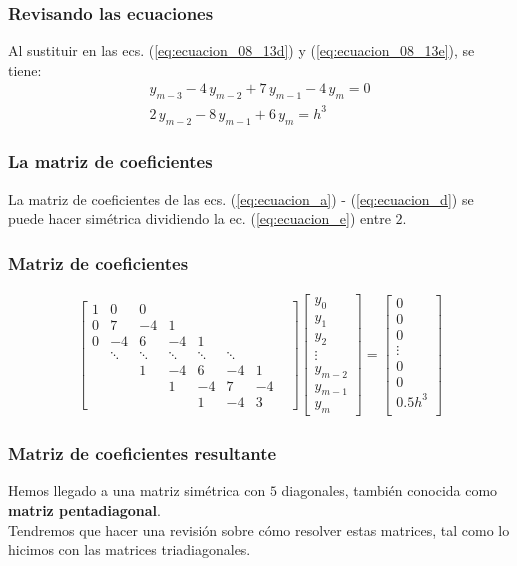 \documentclass[12pt]{beamer}
\begin{document}
\begin{frame}
\frametitle{Revisando las ecuaciones}
Al sustituir en las ecs. (\ref{eq:ecuacion_08_13d}) y (\ref{eq:ecuacion_08_13e}), se tiene:
\pause
\begin{subequations}
\begin{align}
y_{m-3} - 4 \, y_{m-2} + 7 \, y_{m-1} - 4 \, y_{m} = 0 \label{eq:ecuacion_d} \tag{d} \\[0.5em]
2 \, y_{m-2} - 8 \, y_{m-1} + 6 \, y_{m} = h^{3} \label{eq:ecuacion_e} \tag{e}
\end{align}
\end{subequations}
\end{frame}
\begin{frame}
\frametitle{La matriz de coeficientes}
La matriz de coeficientes de las ecs. (\ref{eq:ecuacion_a}) - (\ref{eq:ecuacion_d}) se puede hacer simétrica \pause dividiendo la ec. (\ref{eq:ecuacion_e}) entre $2$.
\end{frame}
\begin{frame}
\frametitle{Matriz de coeficientes}
\renewcommand{\arraystretch}{1}
\begin{align*}
\begin{bmatrix}
1 & 0 & 0 & & & & & \\
0 & 7 & -4 & 1 & & & & \\
0 & -4 & 6 & -4 & 1 & & & \\
 & \ddots & \ddots & \ddots & \ddots & \ddots & & \\
 & & 1 & -4 & 6 & -4 & 1 \\
 & & & 1 & -4 & 7 & -4 \\
 & & & & 1 & -4 & 3
\end{bmatrix}
\begin{bmatrix}
y_{0} \\
y_{1} \\
y_{2} \\
\vdots \\
y_{m-2} \\
y_{m-1} \\
y_{m}
\end{bmatrix}
=
\begin{bmatrix}
0 \\
0 \\
0 \\
\vdots \\
0 \\
0 \\
0.5 h^{3} \\
\end{bmatrix}
\end{align*}
\end{frame}
\begin{frame}
\frametitle{Matriz de coeficientes resultante}
Hemos llegado a una matriz simétrica con $5$ diagonales, \pause también conocida como \textbf{\textcolor{ao}{matriz pentadiagonal}}.
\\
\bigskip
\pause
Tendremos que hacer una revisión sobre cómo resolver estas matrices, tal como lo hicimos con las matrices triadiagonales.
\end{frame}
\end{document}
